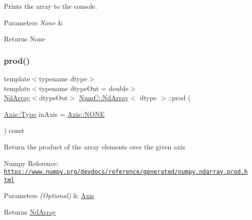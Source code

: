 Prints the array to the console.


\begin{DoxyParams}{Parameters}
{\em None} & \\
\hline
\end{DoxyParams}
\begin{DoxyReturn}{Returns}
None 
\end{DoxyReturn}
\mbox{\label{class_num_c_1_1_nd_array_ab8ed6e901ba5ef37797047b4bbf67b73}} 
\subsubsection{\texorpdfstring{prod()}{prod()}}
{\footnotesize\ttfamily template$<$typename dtype$>$ \\
template$<$typename dtype\+Out  = double$>$ \\
\mbox{\hyperlink{class_num_c_1_1_nd_array}{Nd\+Array}}$<$dtype\+Out$>$ \mbox{\hyperlink{class_num_c_1_1_nd_array}{Num\+C\+::\+Nd\+Array}}$<$ dtype $>$\+::prod (\begin{DoxyParamCaption}\item[{\mbox{\hyperlink{struct_num_c_1_1_axis_a8e689044ef1941a03482e730c5e7ebb3}{Axis\+::\+Type}}}]{in\+Axis = {\ttfamily \mbox{\hyperlink{struct_num_c_1_1_axis_a8e689044ef1941a03482e730c5e7ebb3a0ae033c4226f7184bf0050b101e7ed94}{Axis\+::\+N\+O\+NE}}} }\end{DoxyParamCaption}) const\hspace{0.3cm}{\ttfamily [inline]}}

Return the product of the array elements over the given axis

Numpy Reference\+: \href{https://www.numpy.org/devdocs/reference/generated/numpy.ndarray.prod.html}{\tt https\+://www.\+numpy.\+org/devdocs/reference/generated/numpy.\+ndarray.\+prod.\+html}


\begin{DoxyParams}{Parameters}
{\em (\+Optional)} & \mbox{\hyperlink{struct_num_c_1_1_axis}{Axis}} \\
\hline
\end{DoxyParams}
\begin{DoxyReturn}{Returns}
\mbox{\hyperlink{class_num_c_1_1_nd_array}{Nd\+Array}} 
\end{DoxyReturn}
\mbox{\label{class_num_c_1_1_nd_array_aa591a54d03a0b7e4169a693431cc0900}} 
